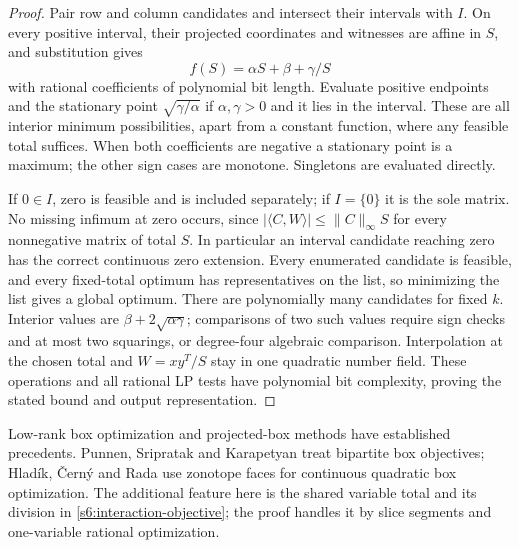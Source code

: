 \begin{proof}
Pair row and column candidates and intersect their intervals with $I$.
On every positive interval, their projected coordinates and witnesses
are affine in $S$, and substitution gives
\begin{equation}
 f(S)=\alpha S+\beta+\gamma/S\label{s6:fractional-piece}
\end{equation}
with rational coefficients of polynomial bit length. Evaluate positive
endpoints and the stationary point $\sqrt{\gamma/\alpha}$ if
$\alpha,\gamma>0$ and it lies in the interval. These are all interior
minimum possibilities, apart from a constant function, where any
feasible total suffices. When both coefficients are negative a stationary
point is a maximum; the other sign cases are monotone. Singletons are
evaluated directly.

If $0\in I$, zero is feasible and is included separately; if $I=\{0\}$
it is the sole matrix. No missing infimum at zero occurs, since
$|\langle C,W\rangle|\le\|C\|_\infty S$ for every nonnegative
matrix of total $S$. In particular an interval candidate reaching zero
has the correct continuous zero extension. Every enumerated candidate
is feasible, and every fixed-total optimum has representatives on the
list, so minimizing the list gives a global optimum.
There are polynomially many candidates for fixed $k$. Interior values
are $\beta+2\sqrt{\alpha\gamma}$; comparisons of two such values
require sign checks and at most two squarings, or degree-four algebraic
comparison. Interpolation at the chosen total and $W=xy^T/S$ stay in
one quadratic number field. These operations and all rational LP tests
have polynomial bit complexity, proving the stated bound and output
representation.
\end{proof}

Low-rank box optimization and projected-box methods have established
precedents. Punnen, Sripratak and Karapetyan
\cite[Sections~3.2--3.3]{s6:punnen2015} treat bipartite box objectives;
Hlad\'ik, \v{C}ern\'y and Rada \cite{s6:hladik2021} use zonotope faces
for continuous quadratic box optimization. The additional feature here
is the shared variable total and its division in
\eqref{s6:interaction-objective}; the proof handles it by slice segments
and one-variable rational optimization.

